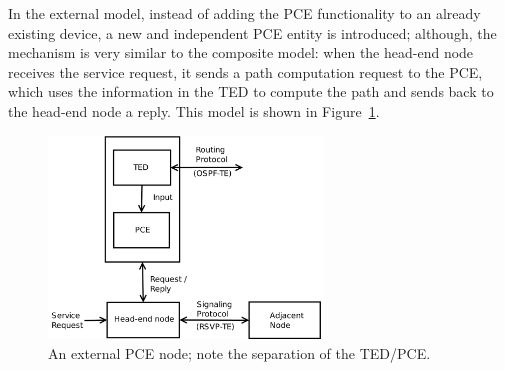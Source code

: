 \documentclass[10pt,a4paper]{report}
\begin{document}
In the external model, instead of adding the PCE functionality to an
already existing device, a new and independent PCE entity is
introduced; although, the mechanism is very similar to the composite
model: when the head-end node receives the service request, it sends a
path computation request to the PCE, which uses the information in the
TED to compute the path and sends back to the head-end node a
reply. This model is shown in Figure~\ref{fig:pce_external}.

\begin{figure}[!htbp]
  \centering
  \includegraphics[width=0.65\textwidth]{img/pce_external}
  \caption[External PCE model]{An external PCE node; note the
    separation of the TED/PCE.}
  \label{fig:pce_external}
\end{figure}
\end{document}
